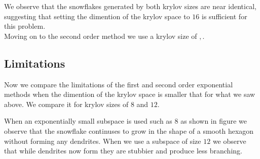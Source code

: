 We observe that the snowflakes generated by both krylov sizes are near identical, 
suggesting that setting the dimention of the krylov space to $16$ is sufficient for this problem.\\

Moving on to the second order method we use a krylov size of $, $.

\subsection{Limitations}
Now we compare the limitations of the first and second order exponential methods when the dimention of the krylov space is smaller that for what we saw above.
We compare it for krylov sizes of $8$ and $12$.

When an exponentially small subspace is used such as $8$ as shown in figure %
we observe that the snowflake continuses to grow in the shape of a smooth hexagon without forming any dendrites.
When we use a subspace of size $12$ we observe that while dendrites now form they are stubbier and produce less branching.